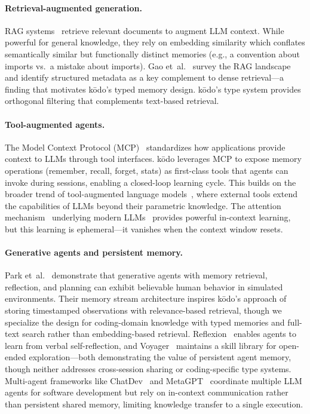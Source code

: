 \documentclass{article}
\begin{document}
\paragraph{Retrieval-augmented generation.} RAG systems~\cite{lewis2020rag,borgeaud2022retro} retrieve relevant documents to augment LLM context. While powerful for general knowledge, they rely on embedding similarity which conflates semantically similar but functionally distinct memories (e.g., a convention about imports vs.\ a mistake about imports). Gao et~al.~\cite{gao2023retrieval} survey the RAG landscape and identify structured metadata as a key complement to dense retrieval---a finding that motivates k\=odo's typed memory design. k\=odo's type system provides orthogonal filtering that complements text-based retrieval.

\paragraph{Tool-augmented agents.} The Model Context Protocol (MCP)~\cite{mcp2024} standardizes how applications provide context to LLMs through tool interfaces. k\=odo leverages MCP to expose memory operations (remember, recall, forget, stats) as first-class tools that agents can invoke during sessions, enabling a closed-loop learning cycle. This builds on the broader trend of tool-augmented language models~\cite{schick2023toolformer,yao2023react,zhang2024codeagent}, where external tools extend the capabilities of LLMs beyond their parametric knowledge. The attention mechanism~\cite{vaswani2017attention} underlying modern LLMs~\cite{brown2020gpt3,touvron2023llama} provides powerful in-context learning, but this learning is ephemeral---it vanishes when the context window resets.

\paragraph{Generative agents and persistent memory.} Park et~al.~\cite{park2023generative} demonstrate that generative agents with memory retrieval, reflection, and planning can exhibit believable human behavior in simulated environments. Their memory stream architecture inspires k\=odo's approach of storing timestamped observations with relevance-based retrieval, though we specialize the design for coding-domain knowledge with typed memories and full-text search rather than embedding-based retrieval. Reflexion~\cite{shinn2023reflexion} enables agents to learn from verbal self-reflection, and Voyager~\cite{wang2024voyager} maintains a skill library for open-ended exploration---both demonstrating the value of persistent agent memory, though neither addresses cross-session sharing or coding-specific type systems. Multi-agent frameworks like ChatDev~\cite{qian2024chatdev} and MetaGPT~\cite{hong2024metagpt} coordinate multiple LLM agents for software development but rely on in-context communication rather than persistent shared memory, limiting knowledge transfer to a single execution.
\end{document}
